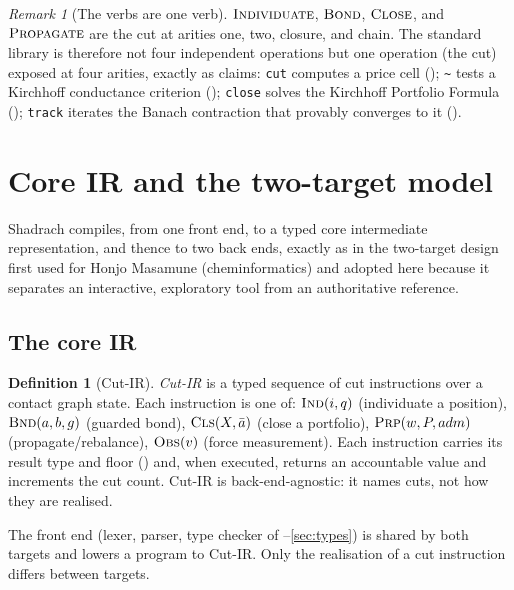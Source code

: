 \documentclass[11pt,a4paper]{article}
\theoremstyle{thmstyle}
\theoremstyle{definition}
\newtheorem{definition}[theorem]{Definition}
\theoremstyle{remark}
\newtheorem{remark}[theorem]{Remark}
\newcommand{\sh}[1]{\texttt{#1}}
\begin{document}
\begin{remark}[The verbs are one verb]
\label{rem:one-verb}
$\textsc{Individuate}$, $\textsc{Bond}$, $\textsc{Close}$, and
$\textsc{Propagate}$ are the cut at arities one, two, closure, and
chain. The standard library is therefore not four independent
operations but one operation (the cut) exposed at four arities, exactly
as  claims: \sh{cut} computes a price cell
(); \sh{\~{}} tests a Kirchhoff conductance
criterion (); \sh{close} solves the Kirchhoff
Portfolio Formula (); \sh{track} iterates the Banach
contraction that provably converges to it ().
\end{remark}

\section{Core IR and the two-target model}
\label{sec:ir}

Shadrach compiles, from one front end, to a typed core intermediate
representation, and thence to two back ends, exactly as in the
two-target design first used for Honjo Masamune (cheminformatics) and
adopted here because it separates an interactive, exploratory tool from
an authoritative reference.

\subsection{The core IR}

\begin{definition}[Cut-IR]
\label{def:ir}
\emph{Cut-IR} is a typed sequence of cut instructions over a contact
graph state. Each instruction is one of: $\textsc{Ind}(i,q)$
(individuate a position), $\textsc{Bnd}(a,b,g)$ (guarded bond),
$\textsc{Cls}(X,\bar a)$ (close a portfolio), $\textsc{Prp}(w,P,adm)$
(propagate/rebalance), $\textsc{Obs}(v)$ (force measurement). Each
instruction carries its result type and floor () and,
when executed, returns an accountable value and increments the cut
count. Cut-IR is back-end-agnostic: it names cuts, not how they are
realised.
\end{definition}

The front end (lexer, parser, type checker of
--\ref{sec:types}) is shared by both targets and
lowers a program to Cut-IR. Only the realisation of a cut instruction
differs between targets.
\end{document}
